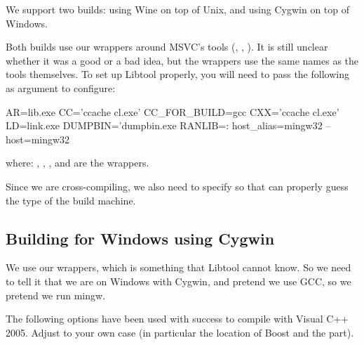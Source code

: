 We support two builds: using Wine on top of Unix, and using Cygwin on
top of Windows.

Both builds use our wrappers around MSVC's tools (,
, ).  It is still unclear whether it
was a good or a bad idea, but the wrappers use the same names as the tools
themselves.  To set up Libtool properly, you will need to pass the following
as argument to configure:

\begin{shell}
AR=lib.exe
CC='ccache cl.exe'
CC_FOR_BUILD=gcc
CXX='ccache cl.exe'
LD=link.exe
DUMPBIN='dumpbin.exe
RANLIB=:
host_alias=mingw32
--host=mingw32
\end{shell}

where: , , , and
 are the wrappers.

Since we are cross-compiling, we also need to specify 
so that  can properly guess the type of the build
machine.

\subsection{Building for Windows using Cygwin}

We use our wrappers, which is something that Libtool cannot know.  So we
need to tell it that we are on Windows with Cygwin, and pretend we use GCC,
so we pretend we run mingw.

The following options have been used with success to compile \usdk with
Visual C++ 2005.  Adjust to your own case (in particular the location of
Boost and the  part).


